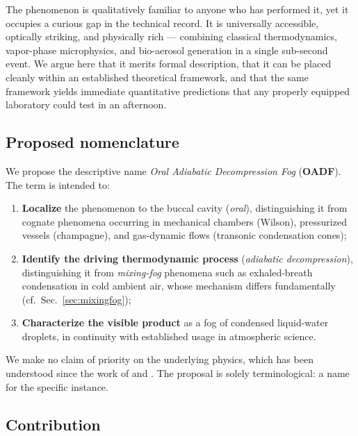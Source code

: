 \documentclass[11pt,a4paper]{article}
\theoremstyle{definition}
\theoremstyle{plain}
\begin{document}
The phenomenon is qualitatively familiar to anyone who has performed it, yet it occupies a curious gap in the technical record. It is universally accessible, optically striking, and physically rich — combining classical thermodynamics, vapor-phase microphysics, and bio-aerosol generation in a single sub-second event. We argue here that it merits formal description, that it can be placed cleanly within an established theoretical framework, and that the same framework yields immediate quantitative predictions that any properly equipped laboratory could test in an afternoon.

\subsection{Proposed nomenclature}
\label{sec:naming}

We propose the descriptive name \emph{Oral Adiabatic Decompression Fog} (\textbf{OADF}). The term is intended to:
\begin{enumerate}
  \item \textbf{Localize} the phenomenon to the buccal cavity (\emph{oral}), distinguishing it from cognate phenomena occurring in mechanical chambers (Wilson), pressurized vessels (champagne), and gas-dynamic flows (transonic condensation cones);
  \item \textbf{Identify the driving thermodynamic process} (\emph{adiabatic decompression}), distinguishing it from \emph{mixing-fog} phenomena such as exhaled-breath condensation in cold ambient air, whose mechanism differs fundamentally (cf.~Sec.~\ref{sec:mixingfog});
  \item \textbf{Characterize the visible product} as a fog of condensed liquid-water droplets, in continuity with established usage in atmospheric science.
\end{enumerate}
We make no claim of priority on the underlying physics, which has been understood since the work of \citet{Wilson1897,Wilson1911} and \citet{Koehler1936}. The proposal is solely terminological: a name for the specific instance.

\subsection{Contribution}
\label{sec:contribution}
\end{document}
